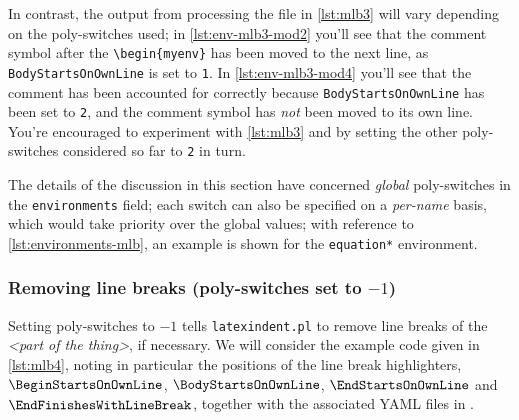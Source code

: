 	\begin{minipage}{.45\linewidth}
	\end{minipage}
	\hfill
	\begin{minipage}{.45\linewidth}
	\end{minipage}

	In contrast, the output from processing the file in \cref{lst:mlb3} will vary depending on the poly-switches used; in \cref{lst:env-mlb3-mod2} you'll see that the comment symbol after the \lstinline!\begin{myenv}! has been moved to the next line, as \texttt{BodyStartsOnOwnLine} is set to \texttt{1}.
	In \cref{lst:env-mlb3-mod4} you'll see that the comment has been accounted for correctly because \texttt{BodyStartsOnOwnLine} has been set to \texttt{2}, and the comment symbol has \emph{not} been moved to its own line.
	You're encouraged to experiment with \cref{lst:mlb3} and by setting the other poly-switches considered so far to \texttt{2} in turn.

	\begin{minipage}{.45\linewidth}
	\end{minipage}
	\hfill
	\begin{minipage}{.45\linewidth}
	\end{minipage}

	The details of the discussion in this section have concerned \emph{global} poly-switches in the \texttt{environments} field; each switch can also be specified on a \emph{per-name} basis, which would take priority over the global values; with reference to \vref{lst:environments-mlb}, an example is shown for the \texttt{equation*} environment.

\subsubsection{Removing line breaks (poly-switches set to $-1$)}
	Setting poly-switches to $-1$ tells \texttt{latexindent.pl} to remove line breaks of the \emph{<part of the thing>}, if necessary.
	We will consider the example code given in \cref{lst:mlb4}, noting in particular the positions of the line break highlighters, $\BeginStartsOnOwnLine$, $\BodyStartsOnOwnLine$, $\EndStartsOnOwnLine$ and $\EndFinishesWithLineBreak$, together with the associated YAML files in .

